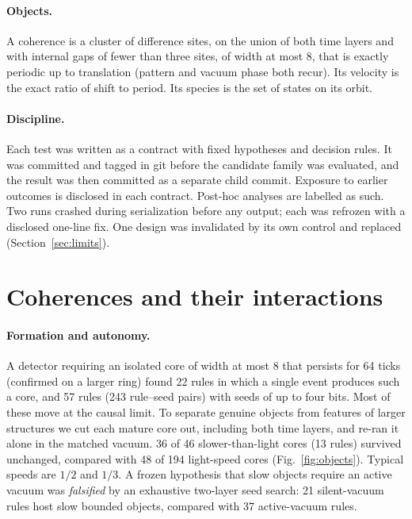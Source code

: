 \documentclass{article}
\newcommand{\ncoreSingle}{22}
\newcommand{\ncoreRules}{57}
\newcommand{\ncorePairs}{243}
\newcommand{\nautSub}{36}
\newcommand{\nautSubN}{46}
\newcommand{\nautLight}{48}
\newcommand{\nautLightN}{194}
\newcommand{\nautRules}{13}
\newcommand{\nsilentSub}{21}
\newcommand{\nactiveSub}{37}
\begin{document}
\paragraph{Objects.} A coherence is a cluster of difference sites, on the union of both time layers
and with internal gaps of fewer than three sites, of width at most 8, that is exactly periodic up to
translation (pattern and vacuum phase both recur). Its velocity is the exact ratio of shift to period.
Its species is the set of states on its orbit.

\paragraph{Discipline.} Each test was written as a contract with fixed hypotheses and decision rules.
It was committed and tagged in git before the candidate family was evaluated, and the result was then
committed as a separate child commit. Exposure to earlier outcomes is disclosed in each contract.
Post-hoc analyses are labelled as such. Two runs crashed during serialization before any output; each
was refrozen with a disclosed one-line fix. One design was invalidated by its own control and replaced
(Section~\ref{sec:limits}).

\section{Coherences and their interactions}
\paragraph{Formation and autonomy.} A detector requiring an isolated core of width at most 8 that
persists for 64 ticks (confirmed on a larger ring) found \ncoreSingle{} rules in which a single
event produces such a core, and \ncoreRules{} rules (\ncorePairs{} rule--seed pairs) with seeds of
up to four bits. Most of these move at the causal limit. To separate genuine objects from features
of larger structures we cut each mature core out, including both time layers, and re-ran it alone in
the matched vacuum. \nautSub{} of \nautSubN{} slower-than-light cores (\nautRules{} rules) survived
unchanged, compared with \nautLight{} of \nautLightN{} light-speed cores (Fig.~\ref{fig:objects}). Typical
speeds are $1/2$ and $1/3$. A frozen hypothesis that slow objects require an active vacuum was
\emph{falsified} by an exhaustive two-layer seed search: \nsilentSub{} silent-vacuum rules host
slow bounded objects, compared with \nactiveSub{} active-vacuum rules.
\end{document}
